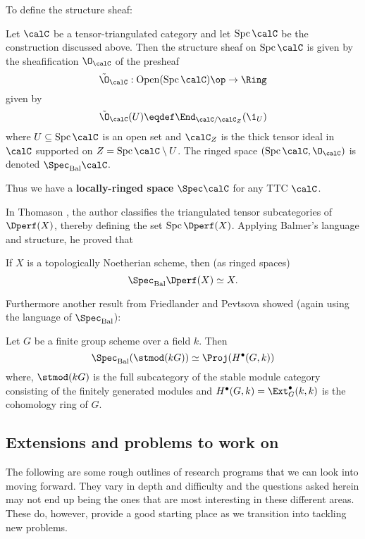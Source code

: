 \documentclass[12pt]{article}
\DeclareMathOperator{\Spc}{Spc}
\begin{document}
	To define the structure sheaf:
	\begin{defn}
		Let $\calC$ be a tensor-triangulated category and let $\Spc\calC$ be the construction discussed above. Then the structure sheaf on $\Spc\calC$ is given by the 
		sheafification $\O_\calC$ of the presheaf 
		\[\tilde\O_\calC:\operatorname{Open}(\Spc\calC)\op\to \Ring\]
		given by 
		\[\tilde\O_\calC(U)\eqdef \End_{\calC/\calC_Z}(\1_U)\]
		where $U\subseteq\Spc\calC$ is an open set and $\calC_Z$ is the thick tensor ideal in $\calC$ supported 
		on $Z=\Spc\calC\setminus U$. The ringed space $(\Spc \calC,\O_\calC)$ is denoted $\Spec_\text{Bal} \calC$.
	\end{defn}
	Thus we have a \textbf{locally-ringed space} $\Spec\calC$ for any TTC $\calC$.

	In Thomason \cite{thomason}, the author classifies the triangulated tensor subcategories 
	of $\Dperf(X)$, thereby defining the set $\Spc\Dperf(X)$. Applying Balmer's language and structure, he proved that 
	\begin{thm}
		If $X$ is a topologically Noetherian scheme, then (as ringed spaces)
		\[\Spec_\text{Bal}\Dperf(X)\simeq X.\]
	\end{thm}

	Furthermore another result from Friedlander and Pevtsova \cite{friedlander-pevtsova-pi} showed (again using 
	the language of $\Spec_\text{Bal}$):
	\begin{thm}
		Let $G$ be a finite group scheme over a field $k$. Then 
		\[\Spec_\text{Bal}(\stmod(kG))\simeq\Proj(H^\bullet(G,k))\]
		where, $\stmod(kG)$ is the full subcategory of the stable module category consisting of the finitely generated modules and $H^\bullet(G,k)=\Ext_G^\bullet(k,k)$ is the cohomology ring of $G$.
	\end{thm}

		

	\subsection{Extensions and problems to work on}
	The following are some rough outlines of research programs that we can look into moving forward. They vary in depth and difficulty and the questions 
	asked herein may not end up being the ones that are most interesting in these different areas. These do, however, provide a good starting place as we transition 
	into tackling new problems.
\end{document}
